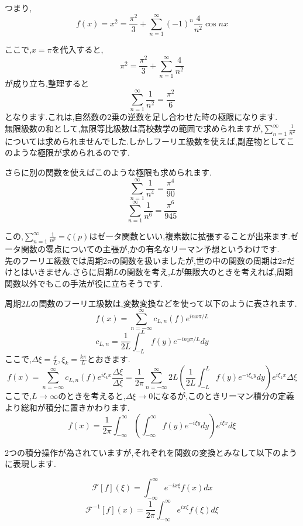 つまり,
\[
  f(x) = x^2 = \frac{\pi^2}{3} + \sum_{n=1}^\infty (-1)^n \frac{4}{n^2} \cos nx
\]

ここで,$x = \pi$を代入すると,
\[
  \pi^2 = \frac{\pi^2}{3} + \sum_{n=1}^\infty \frac{4}{n^2}
\]
が成り立ち,整理すると
\[
  \sum_{n=1}^\infty \frac{1}{n^2} = \frac{\pi^2}{6}
\]
となります.これは,自然数の2乗の逆数を足し合わせた時の極限になります.\\

無限級数の和として,無限等比級数は高校数学の範囲で求められますが,$\sum_{n=1}^\infty \frac{1}{n^2}$については求められませんでした.しかしフーリエ級数を使えば,副産物としてこのような極限が求められるのです.

さらに別の関数を使えばこのような極限も求められます.
\[
  \sum_{n=1}^\infty \frac{1}{n^4} = \frac{\pi^4}{90}
\]
\[
  \sum_{n=1}^\infty \frac{1}{n^6} = \frac{\pi^6}{945}
\]

この,$\sum_{n=1}^\infty \frac{1}{n^p} = \zeta(p)$はゼータ関数といい,複素数に拡張することが出来ます.ゼータ関数の零点についての主張が,かの有名なリーマン予想というわけです.\\


先のフーリエ級数では周期$2\pi$の関数を扱いましたが,世の中の関数の周期は$2\pi$だけとはいきません.さらに周期$L$の関数を考え,$L$が無限大のときを考えれば,周期関数以外でもこの手法が役に立ちそうです.

周期$2L$の関数のフーリエ級数は,変数変換などを使って以下のように表されます.
\[
  f(x) = \sum_{n=-\infty}^\infty c_{L,n}(f) e^{inx\pi/L}
\]
\[
  c_{L,n} = \frac{1}{2L} \int_{-L}^L f(y) e^{-iny\pi/L} dy
\]
ここで,$\Delta\xi = \frac{\pi}{L},{\xi_k} = \frac{k\pi}{L}$とおきます.
\[
  f(x) = \sum_{n=-\infty}^\infty c_{L,n}(f) e^{i{\xi_k}x} \frac{\Delta\xi}{\Delta\xi}
  =\frac{1}{2\pi} \sum_{n=-\infty}^\infty 2{L}(\frac{1}{2L} \int_{-L}^L f(y) e^{-i{\xi_k}y} dy) e^{i{\xi_k}x} {\Delta\xi}
\]
ここで,$L \to \infty$のときを考えると,${\Delta\xi} \to 0$になるが,このときリーマン積分の定義より総和が積分に置きかわります.
\[
  f(x) = \frac{1}{2\pi} \int_{-\infty}^\infty (\int_{-\infty}^\infty f(y) e^{-i\xi y}dy) e^{i\xi x}d\xi
\]

2つの積分操作が為されていますが,それぞれを関数の変換とみなして以下のように表現します.

\[
  \mathcal{F}[f](\xi) = \int_{-\infty}^\infty e^{-ix\xi} f(x) dx
\]
\[
  \mathcal{F}^{-1}[f](x) = \frac{1}{2\pi} \int_{-\infty}^\infty e^{ix\xi} f(\xi) d\xi
\]

